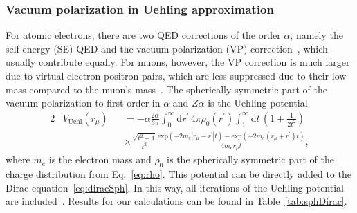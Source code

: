 \subsubsection{Vacuum polarization in Uehling approximation}
\label{sec:qed}

For atomic electrons, there are two QED corrections of the order $\alpha$, namely the self-energy (SE) QED and the vacuum polarization (VP) correction~\cite{Beier2000}, which usually contribute equally. For muons, however, the VP correction is much larger due to virtual electron-positron pairs, which are less suppressed due to their low mass compared to the muon's mass~\cite{BorieRinker1982}. The spherically symmetric part of the vacuum polarization to first order in $\alpha$ and $Z\alpha$ is the Uehling potential~\cite{Elizarov2005}
\begin{alignat}{2}
&V_{\text{Uehl}}(r_\mu)&&=-\alpha \frac{2\alpha}{3\pi}\int_0^\infty \text{d}r^{\prime}\,4\pi \rho_0(r^\prime)\int_1^\infty \text{d}t\,\left( 1+\frac{1}{2t^2} \right)\nonumber\\[7.5pt]
&&&\times\frac{\sqrt{t^2-1}}{t^2} \frac{\text{exp}(-2m_e|r_\mu-r^\prime|t)-\text{exp}(-2m_e(r_\mu+r^\prime)t)}{4m_er_\mu t},
\label{eq:uehl_2}
\end{alignat}
where $m_e$ is the electron mass and $\rho_0$ is the spherically symmetric part of the charge distribution from Eq.~\eqref{eq:rho}. This potential can be directly added to the Dirac equation~\eqref{eq:diracSph}. In this way, all iterations of the Uehling potential are included~\cite{indelicato2013}. Results for our calculations can be found in Table~\ref{tab:sphDirac}.
%
%
